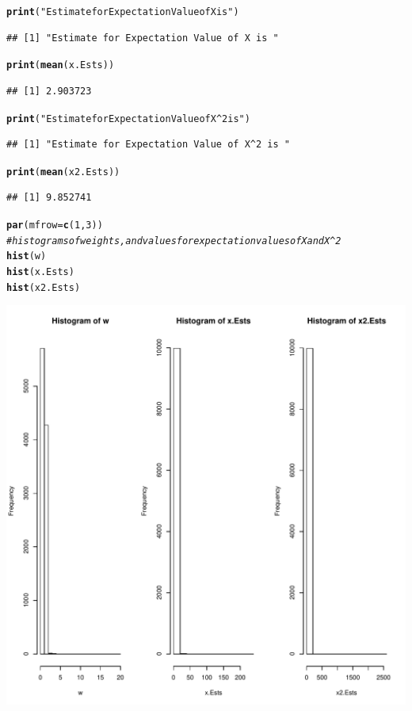 \documentclass{article}\usepackage[]{graphicx}\usepackage[]{color}
\makeatletter
\def\maxwidth{ %
  \ifdim\Gin@nat@width>\linewidth
    \linewidth
  \else
    \Gin@nat@width
  \fi
}
\newcommand{\hlnum}[1]{\textcolor[rgb]{0.686,0.059,0.569}{#1}}%
\newcommand{\hlstr}[1]{\textcolor[rgb]{0.192,0.494,0.8}{#1}}%
\newcommand{\hlcom}[1]{\textcolor[rgb]{0.678,0.584,0.686}{\textit{#1}}}%
\newcommand{\hlstd}[1]{\textcolor[rgb]{0.345,0.345,0.345}{#1}}%
\newcommand{\hlkwc}[1]{\textcolor[rgb]{0.333,0.667,0.333}{#1}}%
\newcommand{\hlkwd}[1]{\textcolor[rgb]{0.737,0.353,0.396}{\textbf{#1}}}%
\newenvironment{kframe}{%
 \def\at@end@of@kframe{}%
 \ifinner\ifhmode%
  \def\at@end@of@kframe{\end{minipage}}%
  \begin{minipage}{\columnwidth}%
 \fi\fi%
 \def\FrameCommand##1{\hskip\@totalleftmargin \hskip-\fboxsep
 \colorbox{shadecolor}{##1}\hskip-\fboxsep
     \hskip-\linewidth \hskip-\@totalleftmargin \hskip\columnwidth}%
 \MakeFramed {\advance\hsize-\width
   \@totalleftmargin\z@ \linewidth\hsize
   \@setminipage}}%
 {\par\unskip\endMakeFramed%
 \at@end@of@kframe}
\newenvironment{knitrout}{}{} %
\makeatother
\begin{document}
\begin{knitrout}
\begin{kframe}
\begin{alltt}
\hlkwd{print}\hlstd{(}\hlstr{"Estimate for Expectation Value of X is "}\hlstd{)}
\end{alltt}
\begin{verbatim}
## [1] "Estimate for Expectation Value of X is "
\end{verbatim}
\begin{alltt}
\hlkwd{print}\hlstd{(}\hlkwd{mean}\hlstd{(x.Ests))}
\end{alltt}
\begin{verbatim}
## [1] 2.903723
\end{verbatim}
\begin{alltt}
\hlkwd{print}\hlstd{(}\hlstr{"Estimate for Expectation Value of X^2 is "}\hlstd{)}
\end{alltt}
\begin{verbatim}
## [1] "Estimate for Expectation Value of X^2 is "
\end{verbatim}
\begin{alltt}
\hlkwd{print}\hlstd{(}\hlkwd{mean}\hlstd{(x2.Ests))}
\end{alltt}
\begin{verbatim}
## [1] 9.852741
\end{verbatim}
\begin{alltt}
\hlkwd{par}\hlstd{(}\hlkwc{mfrow}\hlstd{=}\hlkwd{c}\hlstd{(}\hlnum{1}\hlstd{,}\hlnum{3}\hlstd{))}
\hlcom{#histograms of weights, and values for expectation values of X and X^2}
\hlkwd{hist}\hlstd{(w)}
\hlkwd{hist}\hlstd{(x.Ests)}
\hlkwd{hist}\hlstd{(x2.Ests)}
\end{alltt}
\end{kframe}
\includegraphics[width=\maxwidth]{figure/unnamed-chunk-3-1} 

\end{knitrout}
\end{document}
